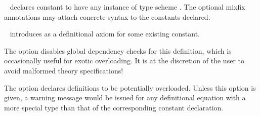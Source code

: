 \begin{isabellebody}
\begin{isamarkuptext}
  \begin{description}

  \item \hyperlink{command.consts}{\mbox{}}~ declares constant  to have any instance of type scheme .  The optional
  mixfix annotations may attach concrete syntax to the constants
  declared.
  
  \item \hyperlink{command.defs}{\mbox{}}~ introduces 
  as a definitional axiom for some existing constant.
  
  The  option disables global dependency checks
  for this definition, which is occasionally useful for exotic
  overloading.  It is at the discretion of the user to avoid malformed
  theory specifications!
  
  The  option declares definitions to be
  potentially overloaded.  Unless this option is given, a warning
  message would be issued for any definitional equation with a more
  special type than that of the corresponding constant declaration.
  

\end{description}
\end{isamarkuptext}
\end{isabellebody}
